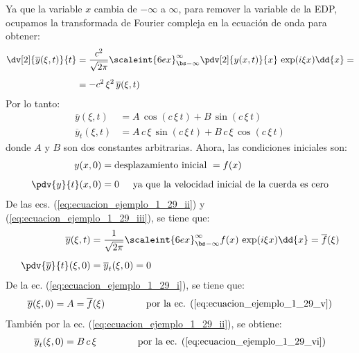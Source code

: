 Ya que la variable $x$ cambia de $-\infty$ a $\infty$, para remover la variable de la EDP, ocupamos la transformada de Fourier compleja en la ecuación de onda para obtener:
\begin{align*}
\dv[2]{\overline{y}(\xi, t)}{t} &= \dfrac{c^{2}}{\sqrt{2 \pi}} \scaleint{6ex}_{\bs -\infty}^{\infty} \pdv[2]{y(x, t)}{x} \, \exp(i \xi x) \dd{x} = \\[0.5em]
&= - c^{2} \, \xi^{2} \, \overline{y} (\xi, t)
\end{align*}
Por lo tanto:
\begin{align}
\overline{y} (\xi, t) &= A \, \cos (c \, \xi \, t) + B \, \sin (c \, \xi \, t) \label{eq:ecuacion_ejemplo_1_29_i} \\[0.5em]
\overline{y}_{t} (\xi, t) &= A \, c \, \xi \, \sin (c \, \xi \, t) + B \, c \, \xi \, \cos (c \, \xi \, t) \label{eq:ecuacion_ejemplo_1_29_ii}
\end{align}
donde $A$ y $B$ son dos constantes arbitrarias. Ahora, las condiciones iniciales son:
\begin{align}
y(x, 0) &= \mbox{desplazamiento inicial } = f(x) \label{eq:ecuacion_ejemplo_1_29_iii} \\[0.5em]
\pdv{y}{t} (x, 0) &= 0 \hspace{0.5cm} \mbox{ya que la velocidad inicial de la cuerda es cero} \label{eq:ecuacion_ejemplo_1_29_iv}
\end{align}
De las ecs. (\ref{eq:ecuacion_ejemplo_1_29_ii}) y (\ref{eq:ecuacion_ejemplo_1_29_iii}), se tiene que:
\begin{align}
\overline{y} (\xi, t) &= \dfrac{1}{\sqrt{2 \pi}} \scaleint{6ex}_{\bs -\infty}^{\infty} f(x) \, \exp(i \xi x) \dd{x} = \overline{f} (\xi) \label{eq:ecuacion_ejemplo_1_29_v} \\[0.5em]
\pdv{\overline{y}}{t} (\xi, 0) &= \overline{y}_{t} (\xi, 0) = 0 \label{eq:ecuacion_ejemplo_1_29_vi}
\end{align}
De la ec. (\ref{eq:ecuacion_ejemplo_1_29_i}), se tiene que:
\begin{align}
\overline{y} (\xi, 0) = A = \overline{f} (\xi) \hspace{1.5cm} \mbox{por la ec. (\ref{eq:ecuacion_ejemplo_1_29_v})}
\end{align}
También por la ec. (\ref{eq:ecuacion_ejemplo_1_29_ii}), se obtiene:
\begin{align}
\overline{y}_{t} (\xi, 0) = B \, c \, \xi \hspace{1.5cm} \mbox{por la ec. (\ref{eq:ecuacion_ejemplo_1_29_vi})}
\end{align}
